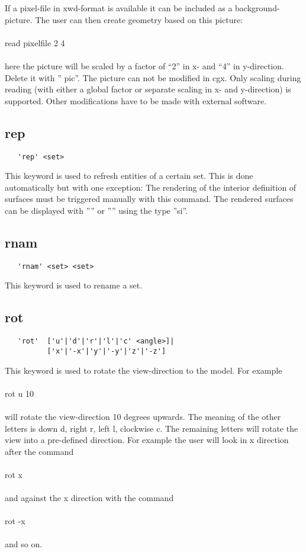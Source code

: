 \documentclass{article}
\begin{document}
If a pixel-file in xwd-format is available it can be included as a background-picture. The user can then create geometry based on this picture:\\\\read pixelfile 2 4\\\\here the picture will be scaled by a factor of ``2'' in x- and ``4'' in y-direction. Delete it with '' pic''. The picture can not be modified in cgx. Only scaling during reading (with either a global factor or separate scaling in x- and y-direction) is supported. Other modifications have to be made with external software.


\subsection{\label{rep}rep}
\begin{verbatim}
   'rep' <set>  
\end{verbatim}
This keyword is used to refresh entities of a certain set. This is done automatically but with one exception: The rendering of the interior definition of surfaces must be triggered manually with this command. The rendered surfaces can be displayed with '''' or  '''' using the type ''si''.

\subsection{\label{rnam}rnam}
\begin{verbatim}
   'rnam' <set> <set>  
\end{verbatim}
This keyword is used to rename a set.

\subsection{\label{rot}rot}
\begin{verbatim}
   'rot'  ['u'|'d'|'r'|'l'|'c' <angle>]|
          ['x'|'-x'|'y'|'-y'|'z'|'-z'] 
\end{verbatim}
This keyword is used to rotate the view-direction to the model. For example\\\\rot u 10\\\\will rotate the view-direction 10 degrees upwards. The meaning of the other letters is down d, right r, left l, clockwise c. The remaining letters will rotate the view into a pre-defined direction. For example the user will look in x direction after the command\\\\rot x\\\\and against the x direction with the command\\\\rot -x\\\\and so on.
\end{document}
